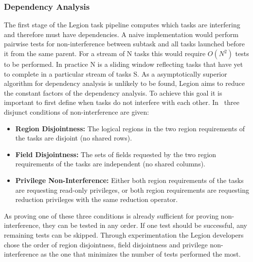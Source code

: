 \documentclass{article}      %
\begin{document}
\subsubsection{Dependency Analysis}\label{sec:dependency}
The first stage of the Legion task pipeline
computes which tasks are interfering and therefore must have dependencies.
A naive implementation would perform pairwise tests for non-interference between subtask and all tasks launched before it from the same parent. For a stream of N tasks this would require $O(N^2)$ tests to be performed. In practice N is a sliding window reflecting tasks that have yet to complete in a particular stream of tasks S.
As a asymptotically superior algorithm for dependency analysis is unlikely to be found, Legion aims to reduce the constant factors of the dependency analysis.
To achieve this goal it is important to first define when tasks do not interfere with each other. In~\cite{BauerThesis} three disjunct conditions of non-interference are given:
\begin{itemize}
	\item \textbf{Region Disjointness:} The logical regions in the two region requirements of the tasks are disjoint (no shared rows).
	\item \textbf{Field Disjointness:} The sets of fields requested by the two region requirements of the tasks are independent (no shared columns).
	\item \textbf{Privilege Non-Interference:} Either both region requirements of the tasks are requesting read-only privileges, or both region requirements are requesting reduction privileges with the same reduction operator.
\end{itemize}
As proving one of these three conditions is already sufficient for proving non-interference, they can be tested in any order. If one test should be successful, any remaining tests can be skipped. Through experimentation the Legion developers chose the order of region disjointness, field disjointness and privilege non-interference as the one that minimizes the number of tests performed the most.
\end{document}
